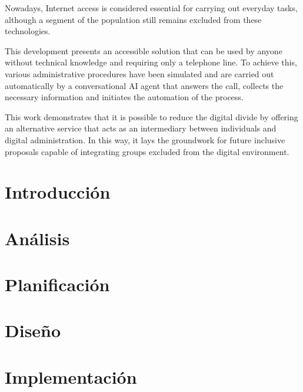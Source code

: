 \documentclass[openright,twoside,11pt]{book}
\begin{document}
Nowadays, Internet access is considered essential for carrying out everyday tasks, although a segment of the population still remains excluded from these technologies.

This development presents an accessible solution that can be used by anyone without technical knowledge and requiring only a telephone line. 
To achieve this, various administrative procedures have been simulated and are carried out automatically by a conversational AI agent that answers the call, collects the necessary information and initiates the automation of the process.

This work demonstrates that it is possible to reduce the digital divide by offering an alternative service that acts as an intermediary between individuals and digital administration. 
In this way, it lays the groundwork for future inclusive proposals capable of integrating groups excluded from the digital environment.



\tableofcontents %

\cleardoublepage
{} %
\listoffigures %

\cleardoublepage
{} %
\listoftables %




\chapter{Introducción}


\chapter{Análisis}


\chapter{Planificación}


\chapter{Diseño}


\chapter{Implementación}

\end{document}
